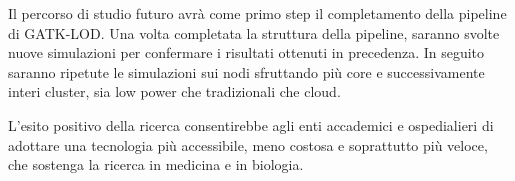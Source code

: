Il percorso di studio futuro avrà come primo step il completamento della pipeline di GATK-LOD.
Una volta completata la struttura della pipeline, saranno svolte nuove simulazioni per confermare i risultati ottenuti in precedenza.
In seguito saranno ripetute le simulazioni sui nodi sfruttando più core e successivamente interi cluster, sia low power che tradizionali che cloud.

L'esito positivo della ricerca consentirebbe agli enti accademici e ospedialieri di adottare una tecnologia più accessibile, meno costosa e soprattutto più veloce, che sostenga la ricerca in medicina e in biologia.


